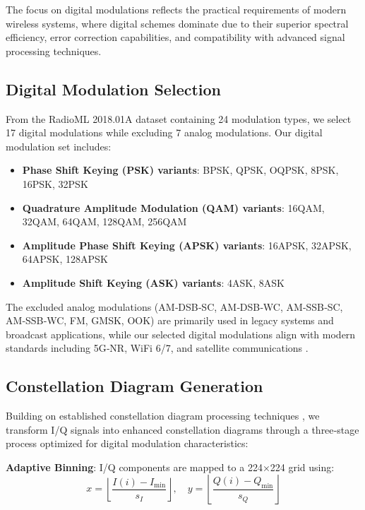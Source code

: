 \documentclass{ELSP}
\begin{document}
The focus on digital modulations reflects the practical requirements of modern wireless systems, where digital schemes dominate due to their superior spectral efficiency, error correction capabilities, and compatibility with advanced signal processing techniques.

\subsection{Digital Modulation Selection}

From the RadioML 2018.01A dataset containing 24 modulation types, we select 17 digital modulations while excluding 7 analog modulations. Our digital modulation set includes:
\begin{itemize}
\item \textbf{Phase Shift Keying (PSK) variants}: BPSK, QPSK, OQPSK, 8PSK, 16PSK, 32PSK
\item \textbf{Quadrature Amplitude Modulation (QAM) variants}: 16QAM, 32QAM, 64QAM, 128QAM, 256QAM
\item \textbf{Amplitude Phase Shift Keying (APSK) variants}: 16APSK, 32APSK, 64APSK, 128APSK
\item \textbf{Amplitude Shift Keying (ASK) variants}: 4ASK, 8ASK
\end{itemize}

The excluded analog modulations (AM‑DSB‑SC, AM‑DSB‑WC, AM‑SSB‑SC, AM‑SSB‑WC, FM, GMSK, OOK) are primarily used in legacy systems and broadcast applications, while our selected digital modulations align with modern standards including 5G‑NR, WiFi 6/7, and satellite communications \cite{sun2022amc}.

\subsection{Constellation Diagram Generation}

Building on established constellation diagram processing techniques \cite{doan2020learning,kumar2020automatic}, we transform I/Q signals into enhanced constellation diagrams through a three‑stage process optimized for digital modulation characteristics:

\textbf{Adaptive Binning}: I/Q components are mapped to a 224×224 grid using:
\begin{equation}
x = \left\lfloor \frac{I(i) - I_{\min}}{s_I} \right\rfloor, \quad y = \left\lfloor \frac{Q(i) - Q_{\min}}{s_Q} \right\rfloor
\end{equation}
\end{document}
